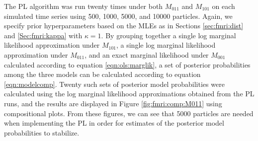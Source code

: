 The PL algorithm was run twenty times under both $M_{011}$ and $M_{101}$ on each simulated time series using 500, 1000, 5000, and 10000 particles. Again, we specify prior hyperparameters based on the MLEs as in Sections \ref{sec:fmri:dist} and \ref{Sec:fmri:kappa} with $\kappa = 1$. By grouping together a single log marginal likelihood approximation under $M_{101}$, a single log marginal likelihood approximation under $M_{011}$, and an exact marginal likelihood under $M_{001}$ calculated according to equation \eqref{eqn:ols:marglik}, a set of posterior probabilities among the three models can be calculated according to equation \eqref{eqn:modelcomp}. Twenty such sets of posterior model probabilities were calculated using the log marginal likelihood approximations obtained from the PL runs, and the results are displayed in Figure \ref{fig:fmri:comp:M011} using compositional plots. From these figures, we can see that 5000 particles are needed when implementing the PL in order for estimates of the posterior model probabilities to stabilize.

%
%

